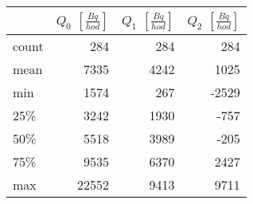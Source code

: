 \begin{tabular}{lrrr}
\toprule
{} &  $Q_0$ $\left[\si{\frac{Bq}{hod}}\right]$ &  $Q_1$ $\left[\si{\frac{Bq}{hod}}\right]$ &  $Q_2$ $\left[\si{\frac{Bq}{hod}}\right]$ \\
\midrule
count &                                       284 &                                       284 &                                       284 \\
mean  &                                      7335 &                                      4242 &                                      1025 \\
min   &                                      1574 &                                       267 &                                     -2529 \\
25\%   &                                      3242 &                                      1930 &                                      -757 \\
50\%   &                                      5518 &                                      3989 &                                      -205 \\
75\%   &                                      9535 &                                      6370 &                                      2427 \\
max   &                                     22552 &                                      9413 &                                      9711 \\
\bottomrule
\end{tabular}
